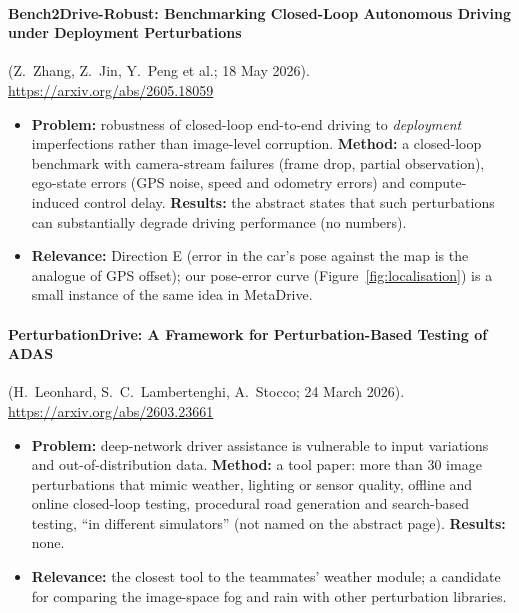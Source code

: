 \paragraph{Bench2Drive-Robust: Benchmarking Closed-Loop Autonomous Driving under Deployment Perturbations} (Z.~Zhang, Z.~Jin, Y.~Peng et al.; 18 May 2026). \url{https://arxiv.org/abs/2605.18059}
\begin{itemize}
\item \textbf{Problem:} robustness of closed-loop end-to-end driving to \emph{deployment} imperfections rather than image-level corruption. \textbf{Method:} a closed-loop benchmark with camera-stream failures (frame drop, partial observation), ego-state errors (GPS noise, speed and odometry errors) and compute-induced control delay. \textbf{Results:} the abstract states that such perturbations can substantially degrade driving performance (no numbers).
\item \textbf{Relevance:} Direction E (error in the car's pose against the map is the analogue of GPS offset); our pose-error curve (Figure~\ref{fig:localisation}) is a small instance of the same idea in MetaDrive.
\end{itemize}

\paragraph{PerturbationDrive: A Framework for Perturbation-Based Testing of ADAS} (H.~Leonhard, S.~C.~Lambertenghi, A.~Stocco; 24 March 2026). \url{https://arxiv.org/abs/2603.23661}
\begin{itemize}
\item \textbf{Problem:} deep-network driver assistance is vulnerable to input variations and out-of-distribution data. \textbf{Method:} a tool paper: more than 30 image perturbations that mimic weather, lighting or sensor quality, offline and online closed-loop testing, procedural road generation and search-based testing, ``in different simulators'' (not named on the abstract page). \textbf{Results:} none.
\item \textbf{Relevance:} the closest tool to the teammates' weather module; a candidate for comparing the image-space fog and rain with other perturbation libraries.
\end{itemize}

